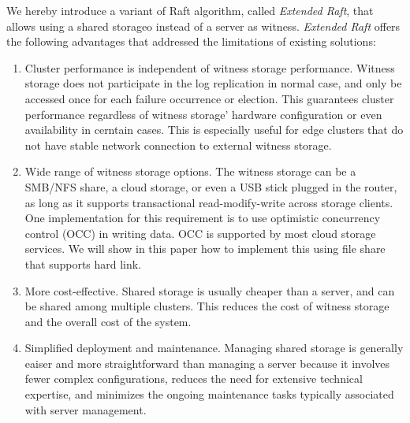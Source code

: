 We hereby introduce a variant of Raft algorithm, called \textit{Extended Raft}, that allows using a shared storageo instead of a server as witness. \textit{Extended Raft} offers the following advantages that addressed the limitations of existing solutions:
\begin{enumerate}
    \item Cluster performance is independent of witness storage performance. Witness storage does not participate in the log replication in normal case, and only be accessed once for each failure occurrence or election. This guarantees cluster performance regardless of witness storage' hardware configuration or even availability in cerntain cases. This is especially useful for edge clusters that do not have stable network connection to external witness storage.
    \item Wide range of witness storage options. The witness storage can be a SMB/NFS share, a cloud storage, or even a USB stick plugged in the router, as long as it supports transactional read-modify-write across storage clients. One implementation for this requirement is to use optimistic concurrency control (OCC) in writing data. OCC is supported by most cloud storage services. We will show in this paper how to implement this using file share that supports hard link.
    \item More cost-effective. Shared storage is usually cheaper than a server, and can be shared among multiple clusters. This reduces the cost of witness storage and the overall cost of the system.
    \item Simplified deployment and maintenance. Managing shared storage is generally eaiser and more straightforward than managing a server because it involves fewer complex configurations, reduces the need for extensive technical expertise, and minimizes the ongoing maintenance tasks typically associated with server management.
\end{enumerate}
